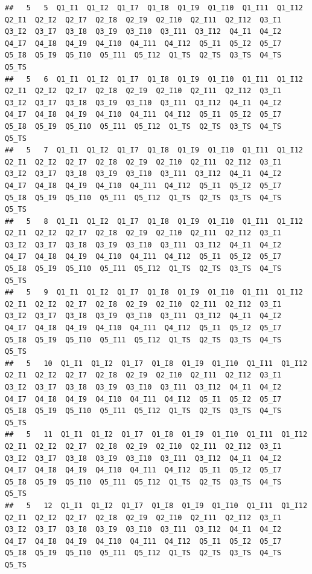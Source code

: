 \documentclass[
]{book}
\begin{document}
\begin{verbatim}
##   5   5  Q1_I1  Q1_I2  Q1_I7  Q1_I8  Q1_I9  Q1_I10  Q1_I11  Q1_I12  Q2_I1  Q2_I2  Q2_I7  Q2_I8  Q2_I9  Q2_I10  Q2_I11  Q2_I12  Q3_I1  Q3_I2  Q3_I7  Q3_I8  Q3_I9  Q3_I10  Q3_I11  Q3_I12  Q4_I1  Q4_I2  Q4_I7  Q4_I8  Q4_I9  Q4_I10  Q4_I11  Q4_I12  Q5_I1  Q5_I2  Q5_I7  Q5_I8  Q5_I9  Q5_I10  Q5_I11  Q5_I12  Q1_TS  Q2_TS  Q3_TS  Q4_TS  Q5_TS
##   5   6  Q1_I1  Q1_I2  Q1_I7  Q1_I8  Q1_I9  Q1_I10  Q1_I11  Q1_I12  Q2_I1  Q2_I2  Q2_I7  Q2_I8  Q2_I9  Q2_I10  Q2_I11  Q2_I12  Q3_I1  Q3_I2  Q3_I7  Q3_I8  Q3_I9  Q3_I10  Q3_I11  Q3_I12  Q4_I1  Q4_I2  Q4_I7  Q4_I8  Q4_I9  Q4_I10  Q4_I11  Q4_I12  Q5_I1  Q5_I2  Q5_I7  Q5_I8  Q5_I9  Q5_I10  Q5_I11  Q5_I12  Q1_TS  Q2_TS  Q3_TS  Q4_TS  Q5_TS
##   5   7  Q1_I1  Q1_I2  Q1_I7  Q1_I8  Q1_I9  Q1_I10  Q1_I11  Q1_I12  Q2_I1  Q2_I2  Q2_I7  Q2_I8  Q2_I9  Q2_I10  Q2_I11  Q2_I12  Q3_I1  Q3_I2  Q3_I7  Q3_I8  Q3_I9  Q3_I10  Q3_I11  Q3_I12  Q4_I1  Q4_I2  Q4_I7  Q4_I8  Q4_I9  Q4_I10  Q4_I11  Q4_I12  Q5_I1  Q5_I2  Q5_I7  Q5_I8  Q5_I9  Q5_I10  Q5_I11  Q5_I12  Q1_TS  Q2_TS  Q3_TS  Q4_TS  Q5_TS
##   5   8  Q1_I1  Q1_I2  Q1_I7  Q1_I8  Q1_I9  Q1_I10  Q1_I11  Q1_I12  Q2_I1  Q2_I2  Q2_I7  Q2_I8  Q2_I9  Q2_I10  Q2_I11  Q2_I12  Q3_I1  Q3_I2  Q3_I7  Q3_I8  Q3_I9  Q3_I10  Q3_I11  Q3_I12  Q4_I1  Q4_I2  Q4_I7  Q4_I8  Q4_I9  Q4_I10  Q4_I11  Q4_I12  Q5_I1  Q5_I2  Q5_I7  Q5_I8  Q5_I9  Q5_I10  Q5_I11  Q5_I12  Q1_TS  Q2_TS  Q3_TS  Q4_TS  Q5_TS
##   5   9  Q1_I1  Q1_I2  Q1_I7  Q1_I8  Q1_I9  Q1_I10  Q1_I11  Q1_I12  Q2_I1  Q2_I2  Q2_I7  Q2_I8  Q2_I9  Q2_I10  Q2_I11  Q2_I12  Q3_I1  Q3_I2  Q3_I7  Q3_I8  Q3_I9  Q3_I10  Q3_I11  Q3_I12  Q4_I1  Q4_I2  Q4_I7  Q4_I8  Q4_I9  Q4_I10  Q4_I11  Q4_I12  Q5_I1  Q5_I2  Q5_I7  Q5_I8  Q5_I9  Q5_I10  Q5_I11  Q5_I12  Q1_TS  Q2_TS  Q3_TS  Q4_TS  Q5_TS
##   5   10  Q1_I1  Q1_I2  Q1_I7  Q1_I8  Q1_I9  Q1_I10  Q1_I11  Q1_I12  Q2_I1  Q2_I2  Q2_I7  Q2_I8  Q2_I9  Q2_I10  Q2_I11  Q2_I12  Q3_I1  Q3_I2  Q3_I7  Q3_I8  Q3_I9  Q3_I10  Q3_I11  Q3_I12  Q4_I1  Q4_I2  Q4_I7  Q4_I8  Q4_I9  Q4_I10  Q4_I11  Q4_I12  Q5_I1  Q5_I2  Q5_I7  Q5_I8  Q5_I9  Q5_I10  Q5_I11  Q5_I12  Q1_TS  Q2_TS  Q3_TS  Q4_TS  Q5_TS
##   5   11  Q1_I1  Q1_I2  Q1_I7  Q1_I8  Q1_I9  Q1_I10  Q1_I11  Q1_I12  Q2_I1  Q2_I2  Q2_I7  Q2_I8  Q2_I9  Q2_I10  Q2_I11  Q2_I12  Q3_I1  Q3_I2  Q3_I7  Q3_I8  Q3_I9  Q3_I10  Q3_I11  Q3_I12  Q4_I1  Q4_I2  Q4_I7  Q4_I8  Q4_I9  Q4_I10  Q4_I11  Q4_I12  Q5_I1  Q5_I2  Q5_I7  Q5_I8  Q5_I9  Q5_I10  Q5_I11  Q5_I12  Q1_TS  Q2_TS  Q3_TS  Q4_TS  Q5_TS
##   5   12  Q1_I1  Q1_I2  Q1_I7  Q1_I8  Q1_I9  Q1_I10  Q1_I11  Q1_I12  Q2_I1  Q2_I2  Q2_I7  Q2_I8  Q2_I9  Q2_I10  Q2_I11  Q2_I12  Q3_I1  Q3_I2  Q3_I7  Q3_I8  Q3_I9  Q3_I10  Q3_I11  Q3_I12  Q4_I1  Q4_I2  Q4_I7  Q4_I8  Q4_I9  Q4_I10  Q4_I11  Q4_I12  Q5_I1  Q5_I2  Q5_I7  Q5_I8  Q5_I9  Q5_I10  Q5_I11  Q5_I12  Q1_TS  Q2_TS  Q3_TS  Q4_TS  Q5_TS

\end{verbatim}
\end{document}
